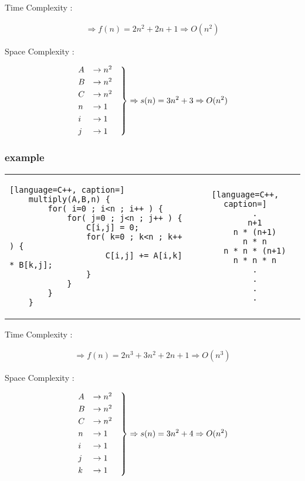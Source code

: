 \documentclass[12pt]{article}
\begin{document}
Time Complexity :


\begin{align*}
\Rightarrow f(n) = 2n^{2} + 2n + 1 \Rightarrow O(n^{2})
\end{align*}





Space Complexity :


\begin{align*}
\begin{rcases}
A &\to n^{2} \quad \\
B &\to n^{2} \\
C &\to n^{2} \\
n &\to 1 \\
i &\to 1 \\
j &\to 1 
\end{rcases}
\Rightarrow s(n) = 3n^{2} + 3 \Rightarrow O(n^{2})
\end{align*}






\subsubsection{example}




\begin{center}
  \bgroup
  \def\arraystretch{1.5}%
  \begin{tabular}{ E  C  }
	\begin{lstlisting}[language=C++, caption=]
	multiply(A,B,n) {
		for( i=0 ; i<n ; i++ ) {
			for( j=0 ; j<n ; j++ ) {
				C[i,j] = 0;
				for( k=0 ; k<n ; k++ ) {
					C[i,j] += A[i,k] * B[k,j];
				}
			}
		}
	}
	\end{lstlisting}
     &  
	\begin{lstlisting}[language=C++, caption=]
	.
	n+1
	n * (n+1)
	n * n
	n * n * (n+1)
	n * n * n
	.
	.
	.
	.
	\end{lstlisting}
  \end{tabular}
  \egroup
\end{center}


Time Complexity :


\begin{align*}
\Rightarrow f(n) = 2n^{3} + 3n^{2} + 2n + 1 \Rightarrow O(n^{3})
\end{align*}



Space Complexity :

\begin{align*}
\begin{rcases}
A &\to n^{2} \quad \\
B &\to n^{2} \\
C &\to n^{2} \\
n &\to 1 \\
i &\to 1 \\
j &\to 1 \\
k &\to 1 
\end{rcases}
\Rightarrow s(n) = 3n^{2} + 4 \Rightarrow O(n^{2})
\end{align*}
\end{document}
